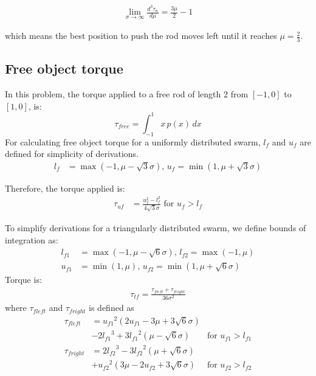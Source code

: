\begin{align}
\lim_{\sigma\to\infty} \frac{d^3\tau_n}{d\mu}= \frac{3\mu}{2}-1
\end{align}

which means the best position to push the rod moves left until it reaches $\mu = \frac{2}{3}$.



\subsection{Free object torque}
In this problem, the torque applied to a free rod of length 2 from $[-1,0]$ to $[1,0]$, is:
\begin{equation}
\tau_{free} = \int_{-1}^1 x\,p(x)\, dx
\end{equation}
For calculating free object torque for a uniformly distributed swarm, $l_f$ and $u_f$ are defined for simplicity of derivations. 
\begin{align}
l_f &= \max({-1,\mu -\sqrt{3} \sigma}),\, u_f = \min({1,\mu+\sqrt{3}\sigma})
\end{align}

Therefore, the torque applied is:
\begin{align}
\tau_{uf} &= \frac{u_f^2-l_f^2}{4\sqrt{3}\sigma} \textrm{  for    }  u_f>l_f
\end{align}

To simplify derivations for a triangularly distributed swarm, we define bounds of integration as:
\begin{align}
l_{f1} &= \max({-1,\mu-\sqrt{6}\sigma}), \,l_{f2} = \max({-1,\mu})\\ \nonumber
u_{f1} &= \min({1,\mu}), \, u_{f2} = \min({1,\mu+\sqrt{6}\sigma}) \nonumber
\end{align}
Torque is:
\begin{align}
\tau_{tf} = \frac{\tau_{fleft}+ \tau_{fright}}{36\sigma^2}
\end{align}
where $\tau_{fleft}$ and $\tau_{fright}$ is defined as
\begin{align}\nonumber
\tau_{fleft} &=  {u_{f1}}^2(2u_{f1} - 3\mu+3\sqrt{6}\sigma)\\ \nonumber
&-2{l_{f1}}^3+3{l_{f1}}^2(\mu-\sqrt{6}\sigma) &   \textrm{for     } u_{f1} > l_{f1}\\ \nonumber
\tau_{fright} &= 2{l_{f2}}^3-3{l_{f2}}^2(\mu+\sqrt{6}\sigma)\\ \nonumber
&+{u_{f2}}^2( 3\mu-2u_{f2}+3\sqrt{6}\sigma) &   \textrm{for     } u_{f2} > l_{f2}\\ \nonumber
\end{align}

